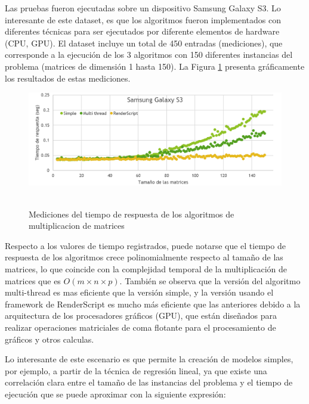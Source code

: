Las pruebas fueron ejecutadas sobre un dispositivo Samsung Galaxy
S3. Lo interesante de este dataset, es que los algoritmos fueron implementados
con diferentes técnicas para ser ejecutados por diferente elementos
de hardware (\ac{CPU}, \ac{GPU}). El dataset incluye un total de
450 entradas (mediciones), que corresponde a la ejecución de los 3
algoritmos con 150 diferentes instancias del problema (matrices de
dimensión 1 hasta 150). La Figura \ref{fig:Mediciones-del-tiempo-multiplicacion-de-matrices}
presenta gráficamente los resultados de estas mediciones.

\begin{figure}
\begin{centering}
\includegraphics[scale=0.68]{images/Samsung}~
\par\end{centering}

\caption{Mediciones del tiempo de respuesta de los algoritmos de multiplicacion
de matrices\label{fig:Mediciones-del-tiempo-multiplicacion-de-matrices}}
\end{figure}


Respecto a los valores de tiempo registrados, puede notarse que el
tiempo de respuesta de los algoritmos crece polinomialmente respecto
al tamaño de las matrices, lo que coincide con la complejidad temporal
de la multiplicación de matrices que es $O(m\times n\times p)$. También
se observa que la versión del algoritmo multi-thread es mas eficiente
que la versión simple, y la versión usando el framework de RenderScript
es mucho más eficiente que las anteriores debido a la arquitectura
de los procesadores gráficos (GPU), que están diseñados para realizar
operaciones matriciales de coma flotante para el procesamiento de
gráficos y otros calculas.

Lo interesante de este escenario es que permite la creación de modelos
simples, por ejemplo, a partir de la técnica de regresión lineal,
ya que existe una correlación clara entre el tamaño de las instancias
del problema y el tiempo de ejecución que se puede aproximar con la
siguiente expresión:

